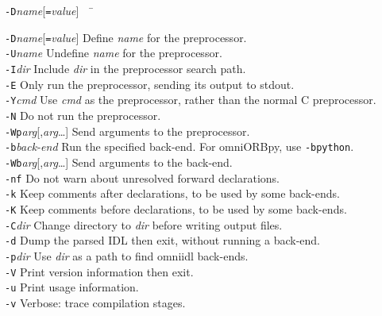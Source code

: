 \documentclass[11pt,twoside,a4paper]{book}
\newcommand{\cmdline}[1]{\texttt{#1}}
\begin{document}
\begin{tabbing}
\cmdline{-D}\textit{name}[\cmdline{=}\textit{value}]~~ \= \kill

\cmdline{-D}\textit{name}[\cmdline{=}\textit{value}]
     \> Define \textit{name} for the preprocessor.\\

\cmdline{-U}\textit{name}
     \> Undefine \textit{name} for the preprocessor.\\

\cmdline{-I}\textit{dir}
     \> Include \textit{dir} in the preprocessor search path.\\

\cmdline{-E}
     \> Only run the preprocessor, sending its output to stdout.\\

\cmdline{-Y}\textit{cmd}
     \> Use \textit{cmd} as the preprocessor, rather than the normal C
        preprocessor.\\

\cmdline{-N}
     \> Do not run the preprocessor.\\

\cmdline{-Wp}\textit{arg}[,\textit{arg}\dots]
     \> Send arguments to the preprocessor.\\

\cmdline{-b}\textit{back-end}
     \> Run the specified back-end. For omniORBpy, use \cmdline{-bpython}.\\

\cmdline{-Wb}\textit{arg}[,\textit{arg}\dots]
     \> Send arguments to the back-end.\\

\cmdline{-nf}
     \> Do not warn about unresolved forward declarations.\\

\cmdline{-k}
     \> Keep comments after declarations, to be used by some back-ends.\\

\cmdline{-K}
     \> Keep comments before declarations, to be used by some back-ends.\\

\cmdline{-C}\textit{dir}
     \> Change directory to \textit{dir} before writing output files.\\

\cmdline{-d}
     \> Dump the parsed IDL then exit, without running a back-end.\\

\cmdline{-p}\textit{dir}
     \> Use \textit{dir} as a path to find omniidl back-ends.\\

\cmdline{-V}
     \> Print version information then exit.\\

\cmdline{-u}
     \> Print usage information.\\

\cmdline{-v}
     \> Verbose: trace compilation stages.\\

\end{tabbing}
\end{document}
